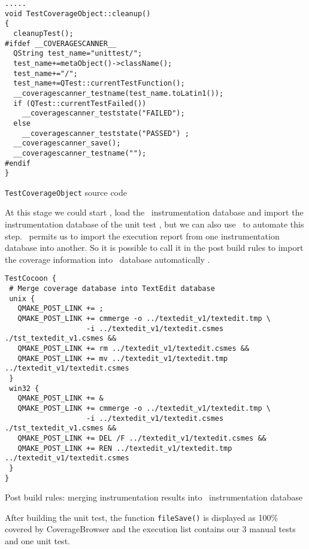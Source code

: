 \begin{figureenv}
  \scriptsize
\begin{verbatim}
.....
void TestCoverageObject::cleanup()
{
  cleanupTest();
#ifdef __COVERAGESCANNER__
  QString test_name="unittest/";
  test_name+=metaObject()->className();
  test_name+="/";
  test_name+=QTest::currentTestFunction();
  __coveragescanner_testname(test_name.toLatin1());
  if (QTest::currentTestFailed())
    __coveragescanner_teststate("FAILED"); 
  else 
    __coveragescanner_teststate("PASSED") ; 
  __coveragescanner_save();
  __coveragescanner_testname(""); 
#endif
}
\end{verbatim}
\caption{\texttt{TestCoverageObject} source code}
\label{lst:src6}
\end{figureenv}

At this stage we could start \CoverageBrowser, load the \TextEdit\ instrumentation
database and import the instrumentation database of the unit test
, but we can also use \cmmerge\ to
automate this step. \cmmerge\ permits us  to import the execution report from one
instrumentation database into another. So it is possible to call it in
the post build rules to import the coverage information into \TextEdit\
database automatically .

\begin{figureenv}
  \scriptsize
\begin{verbatim}
TestCocoon {
 # Merge coverage database into TextEdit database
 unix {
   QMAKE_POST_LINK += ;
   QMAKE_POST_LINK += cmmerge -o ../textedit_v1/textedit.tmp \
                   -i ../textedit_v1/textedit.csmes ./tst_textedit_v1.csmes &&
   QMAKE_POST_LINK += rm ../textedit_v1/textedit.csmes &&
   QMAKE_POST_LINK += mv ../textedit_v1/textedit.tmp ../textedit_v1/textedit.csmes 
 }
 win32 {
   QMAKE_POST_LINK += &
   QMAKE_POST_LINK += cmmerge -o ../textedit_v1/textedit.tmp \
                   -i ../textedit_v1/textedit.csmes ./tst_textedit_v1.csmes &&
   QMAKE_POST_LINK += DEL /F ../textedit_v1/textedit.csmes &&
   QMAKE_POST_LINK += REN ../textedit_v1/textedit.tmp ../textedit_v1/textedit.csmes 
 }
}
\end{verbatim}
\caption{Post build rules: merging instrumentation results into \TextEdit\ instrumentation database}
\label{lst:qmake6}
\end{figureenv}

After building the unit test, the function \verb$fileSave()$ is displayed as
100\% covered by CoverageBrowser and the execution list contains our 3 manual
tests and one unit test. 

